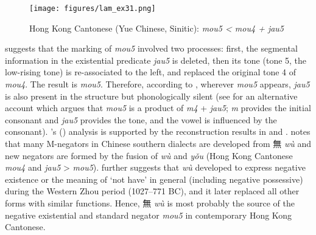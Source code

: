 \documentclass[output=paper]{langscibook}
\begin{document}
\begin{figure}
	\caption{Hong Kong Cantonese (Yue Chinese, Sinitic): \textit{mou5 < mou4 + jau5}}
	\label{ex:lam31}
	\texttt{[image: figures/lam\_ex31.png]}
\end{figure}

\citeauthor{Law2014} suggests that the marking of \textit{mou5} involved two processes: first, the segmental information in the existential predicate \textit{jau5} is deleted, then its tone (tone 5, the low-rising tone) is re-associated to the left, and replaced the original tone 4 of \textit{mou4}. The result is \textit{mou5}. Therefore, according to \citeauthor{Law2014}, wherever \textit{mou5} appears, \textit{jau5} is also present in the structure but phonologically silent (see \citealt{Yue2001} for an alternative account which argues that \textit{mou5} is a product of \textit{m4} + \textit{jau5}; \textit{m} provides the initial consonant and \textit{jau5} provides the tone, and the vowel is influenced by the consonant). \citeauthor{Law2014}'s (\citeyear{Law2014}) analysis is supported by the reconstruction results in \citet{Norman1988} and \citet{Schuessler2007}. \citet[213]{Norman1988} notes that many M-negators in Chinese southern dialects are developed from 無 \textit{wù} and new negators are formed by the fusion of \textit{wù} and \textit{yǒu} (Hong Kong Cantonese \textit{mou4} and \textit{jau5} > \textit{mou5}). \citet[518--519]{Schuessler2007} further suggests that \textit{wù} developed to express negative existence or the meaning of `not have' in general (including negative possessive) during the Western Zhou period (1027–771 BC), and it later replaced all other forms with similar functions. Hence, 無 \textit{wù} is most probably the source of the negative existential and standard negator \textit{mou5} in contemporary Hong Kong Cantonese. 
\end{document}
